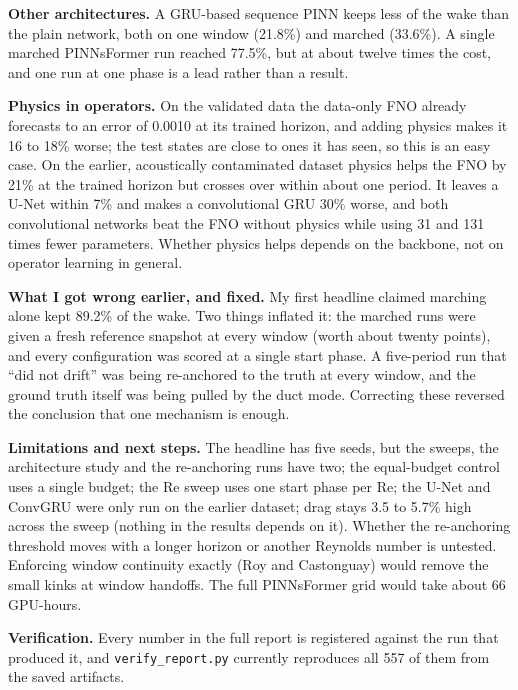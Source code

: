 \documentclass[11pt,a4paper]{article}
\begin{document}
\textbf{Other architectures.} A GRU-based sequence PINN keeps less of the wake
than the plain network, both on one window (21.8\%) and marched (33.6\%). A single
marched PINNsFormer run reached 77.5\%, but at about twelve times the cost, and
one run at one phase is a lead rather than a result.

\textbf{Physics in operators.} On the validated data the data-only FNO already
forecasts to an error of 0.0010 at its trained horizon, and adding physics makes
it 16 to 18\% worse; the test states are close to ones it has seen, so this is
an easy case. On the earlier, acoustically contaminated dataset physics helps the
FNO by 21\% at the trained horizon but crosses over within about one period. It
leaves a U-Net within 7\% and makes a convolutional GRU 30\% worse, and both
convolutional networks beat the FNO without physics while using 31 and 131
times fewer parameters. Whether physics helps depends on the backbone, not on
operator learning in general.

\textbf{What I got wrong earlier, and fixed.} My first headline claimed marching
alone kept 89.2\% of the wake. Two things inflated it: the marched runs were
given a fresh reference snapshot at every window (worth about twenty points),
and every configuration was scored at a single start phase. A five-period run
that ``did not drift'' was being re-anchored to the truth at every window, and
the ground truth itself was being pulled by the duct mode. Correcting these
reversed the conclusion that one mechanism is enough.

\textbf{Limitations and next steps.} The headline has five seeds, but the
sweeps, the architecture study and the re-anchoring runs have two; the
equal-budget control uses a single budget; the Re sweep uses one start phase
per Re; the U-Net and ConvGRU were only run on the earlier dataset; drag stays
3.5 to 5.7\% high across the sweep (nothing in the results depends on it).
Whether the re-anchoring threshold moves with a longer horizon or another
Reynolds number is untested. Enforcing window continuity exactly (Roy and
Castonguay) would remove the small kinks at window handoffs. The full
PINNsFormer grid would take about 66 GPU-hours.

\textbf{Verification.} Every number in the full report is registered against
the run that produced it, and \texttt{verify\_report.py} currently reproduces
all 557 of them from the saved artifacts.
\end{document}
